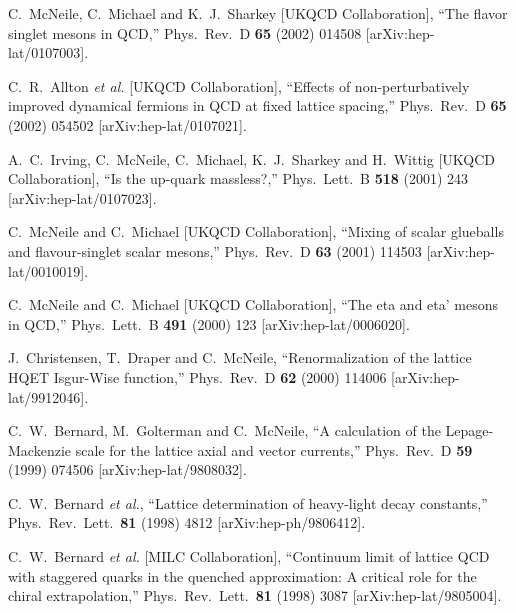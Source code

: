 \begin{thebibliography}{130}
C.~McNeile, C.~Michael and K.~J.~Sharkey  [UKQCD Collaboration],
``The flavor singlet mesons in QCD,''
Phys.\ Rev.\ D {\bf 65} (2002) 014508
[arXiv:hep-lat/0107003].


C.~R.~Allton {\it et al.}  [UKQCD Collaboration],
``Effects of non-perturbatively improved dynamical fermions in QCD at
 fixed lattice spacing,''
Phys.\ Rev.\ D {\bf 65} (2002) 054502
[arXiv:hep-lat/0107021].


A.~C.~Irving, C.~McNeile, C.~Michael, K.~J.~Sharkey and H.~Wittig  [UKQCD
                  Collaboration],
``Is the up-quark massless?,''
Phys.\ Lett.\ B {\bf 518} (2001) 243
[arXiv:hep-lat/0107023].



C.~McNeile and C.~Michael  [UKQCD Collaboration],
``Mixing of scalar glueballs and flavour-singlet scalar mesons,''
Phys.\ Rev.\ D {\bf 63} (2001) 114503
[arXiv:hep-lat/0010019].


C.~McNeile and C.~Michael  [UKQCD Collaboration],
``The eta and eta' mesons in QCD,''
Phys.\ Lett.\ B {\bf 491} (2000) 123
[arXiv:hep-lat/0006020].


J.~Christensen, T.~Draper and C.~McNeile,
``Renormalization of the lattice HQET Isgur-Wise function,''
Phys.\ Rev.\ D {\bf 62} (2000) 114006
[arXiv:hep-lat/9912046].

C.~W.~Bernard, M.~Golterman and C.~McNeile,
``A calculation of the Lepage-Mackenzie scale for the lattice axial and  vector currents,''
Phys.\ Rev.\ D {\bf 59} (1999) 074506
[arXiv:hep-lat/9808032].

C.~W.~Bernard {\it et al.},
``Lattice determination of heavy-light decay constants,''
Phys.\ Rev.\ Lett.\  {\bf 81} (1998) 4812
[arXiv:hep-ph/9806412].

C.~W.~Bernard {\it et al.}  [MILC Collaboration],
``Continuum limit of lattice QCD with staggered quarks in the quenched  approximation: A critical role for the chiral extrapolation,''
Phys.\ Rev.\ Lett.\  {\bf 81} (1998) 3087
[arXiv:hep-lat/9805004].



\end{thebibliography}
